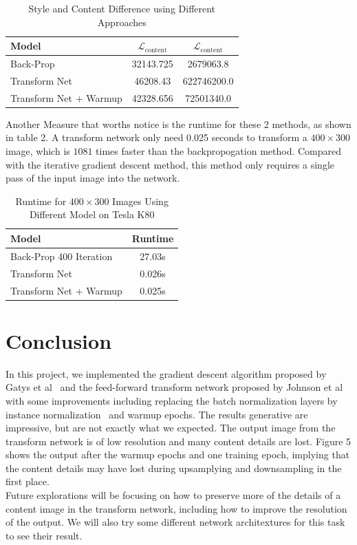\documentclass[10pt,twocolumn,letterpaper]{article}
\begin{document}
\begin{table}
\begin{center}
\begin{tabular}{|l|c|c|}
\hline
Model & $\mathcal{L}_{\text{content}}$ & $\mathcal{L}_{\text{content}}$ \\
\hline\hline
Back-Prop & 32143.725 & 2679063.8\\
Transform Net & 46208.43 & 622746200.0\\
Transform Net + Warmup & 42328.656 & 72501340.0\\
\hline
\end{tabular}
\end{center}
\caption{Style and Content Difference using Different Approaches}
\end{table}

Another Measure that worths notice is the runtime for these 2 methods, as shown in table 2. A transform network only need 0.025 seconds to transform a $400\times 300$ image, which is $1081$ times faster than the backpropogation method. Compared with the iterative gradient descent method, this method only requires a single pass of the input image into the network. 
\begin{table}
\begin{center}
\begin{tabular}{|l|c|}
\hline
Model & Runtime \\
\hline\hline
Back-Prop 400 Iteration & 27.03s\\
Transform Net & 0.026s\\
Transform Net + Warmup & 0.025s\\
\hline
\end{tabular}
\end{center}
\caption{Runtime for $400\times 300$ Images Using Different Model on Tesla K80}
\end{table}

\section{Conclusion}
In this project, we implemented the gradient descent algorithm proposed by Gatys et al~\cite{Gatys} and the feed-forward transform network proposed by Johnson et al~\cite{Johnson} with some improvements including replacing the batch normalization layers by instance normalization~\cite{Ulyanov2} and warmup epochs. The results generative are impressive, but are not exactly what we expected. The output image from the transform network is of low resolution and many content details are lost. Figure 5 shows the output after the warmup epochs and one training epoch, implying that the content details may have lost during upsamplying and downsampling in the first place. \\
Future explorations will be focusing on how to preserve more of the details of a content image in the transform network, including how to improve the resolution of the output. We will also try some different network architextures for this task to see their result. 
\end{document}
